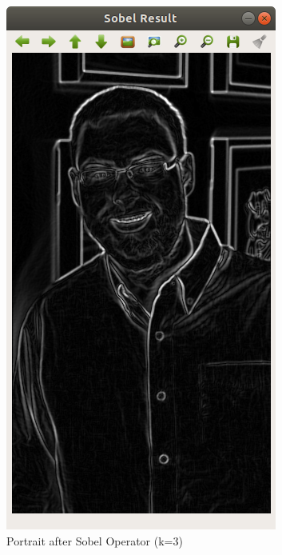 \documentclass[11pt]{article}
\begin{document}
\begin{figure}[H]
\begin{subfigure}[b]{.48\linewidth}
		\includegraphics[width=\linewidth]{Portrait-Sobel}
		\caption{Portrait after Sobel Operator (k=3)}
		\label{fig:trxain1}
	\end{subfigure}
	\begin{subfigure}[b]{.48\linewidth}

\end{subfigure}
\end{figure}
\end{document}
